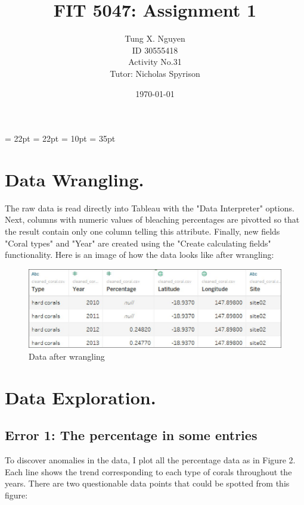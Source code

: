 \documentclass[a4paper,12pt,twoside]{article}
\title{FIT 5047: Assignment 1}
\author{Tung X. Nguyen\\
ID 30555418\\
Activity No.31\\
Tutor: Nicholas Spyrison}
\date{\today}
\begin{document}
\maketitle


\thispagestyle{empty}

\tableofcontents
\thispagestyle{empty}
\newpage

\oddsidemargin = 22pt
\evensidemargin = 22pt
\marginparsep = 10pt
\marginparwidth = 35pt


\section{Data Wrangling.}
The raw data is read directly into Tableau with the "Data Interpreter" options. Next, columns with numeric values of bleaching percentages are pivotted so that the result contain only one column telling this attribute. Finally, new fields "Coral types" and "Year" are created using the "Create calculating fields" functionality. Here is an image of how the data looks like after wrangling:
\begin{figure}[h]
\caption{Data after wrangling}
\includegraphics[scale=.4]{img/wr.jpg}
\centering
\end{figure}
\section{Data Exploration.}

\subsection*{Error 1: The percentage in some entries}
To discover anomalies in the data, I plot all the percentage data as in Figure 2. Each line shows the trend corresponding to each type of corals throughout the years. There are two questionable data points that could be spotted from this figure:
\end{document}
